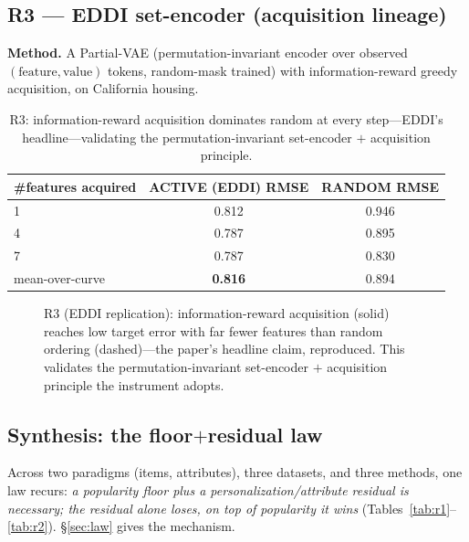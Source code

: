 \subsection{R3 --- EDDI set-encoder (acquisition lineage)}
\textbf{Method.} A Partial-VAE (permutation-invariant encoder over observed $(\text{feature},\text{value})$
tokens, random-mask trained) with information-reward greedy acquisition, on California housing.

\begin{table}[h]\centering\small
\begin{tabular}{lcc}
\toprule
\#features acquired & ACTIVE (EDDI) RMSE & RANDOM RMSE\\
\midrule
1 & 0.812 & 0.946\\
4 & 0.787 & 0.895\\
7 & 0.787 & 0.830\\
mean-over-curve & \textbf{0.816} & 0.894\\
\bottomrule
\end{tabular}
\caption{R3: information-reward acquisition dominates random at every step---EDDI's headline---validating the
permutation-invariant set-encoder $+$ acquisition principle.}
\label{tab:r3}
\end{table}

\begin{figure}[h]\centering
{}
\caption{R3 (EDDI replication): information-reward acquisition (solid) reaches low target error with far fewer
features than random ordering (dashed)---the paper's headline claim, reproduced. This validates the
permutation-invariant set-encoder $+$ acquisition principle the instrument adopts.}
\label{fig:eddi}
\end{figure}

\subsection{Synthesis: the floor$+$residual law}\label{sec:lawsynth}
Across two paradigms (items, attributes), three datasets, and three methods, one law recurs: \emph{a popularity
floor plus a personalization/attribute residual is necessary; the residual alone loses, on top of popularity it
wins} (Tables~\ref{tab:r1}--\ref{tab:r2}). \S\ref{sec:law} gives the mechanism.

